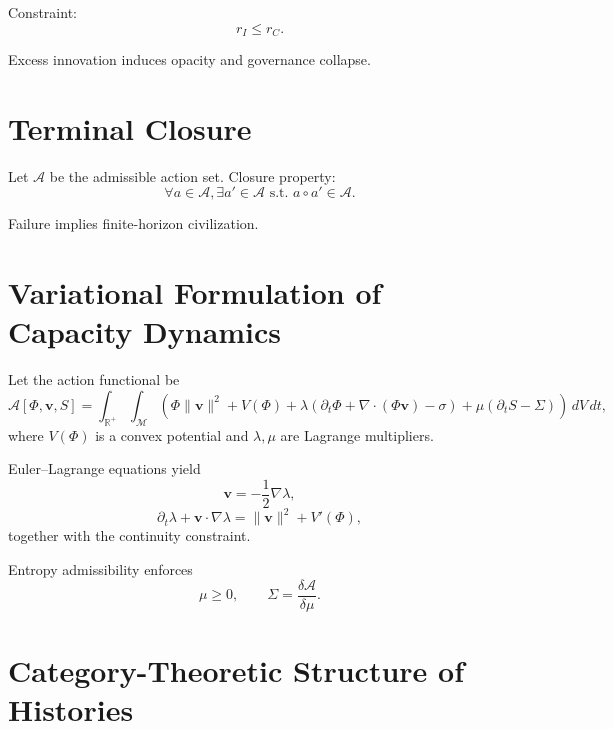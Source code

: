 \documentclass[12pt,oneside]{book}
\begin{document}
Constraint:
\begin{equation}
r_I \le r_C.
\end{equation}

Excess innovation induces opacity and governance collapse.

\chapter{Terminal Closure}

Let \(\mathcal{A}\) be the admissible action set.
Closure property:
\begin{equation}
\forall a \in \mathcal{A}, \exists a' \in \mathcal{A} \text{ s.t. } a \circ a' \in \mathcal{A}.
\end{equation}

Failure implies finite-horizon civilization.

\chapter{Variational Formulation of Capacity Dynamics}

Let the action functional be
\begin{equation}
\mathcal{A}[\Phi,\mathbf{v},S] =
\int_{\mathbb{R}^+}\int_{\mathcal{M}}
\left(
\Phi \|\mathbf{v}\|^2
+ V(\Phi)
+ \lambda (\partial_t \Phi + \nabla \cdot (\Phi \mathbf{v}) - \sigma)
+ \mu (\partial_t S - \Sigma)
\right)\, dV\, dt,
\end{equation}
where \(V(\Phi)\) is a convex potential and \(\lambda,\mu\) are Lagrange multipliers.

Euler–Lagrange equations yield
\begin{equation}
\mathbf{v} = -\frac{1}{2}\nabla \lambda,
\end{equation}
\begin{equation}
\partial_t \lambda + \mathbf{v}\cdot\nabla \lambda
= \|\mathbf{v}\|^2 + V'(\Phi),
\end{equation}
together with the continuity constraint.

Entropy admissibility enforces
\begin{equation}
\mu \ge 0,
\qquad
\Sigma = \frac{\delta \mathcal{A}}{\delta \mu}.
\end{equation}

\chapter{Category-Theoretic Structure of Histories}
\end{document}
